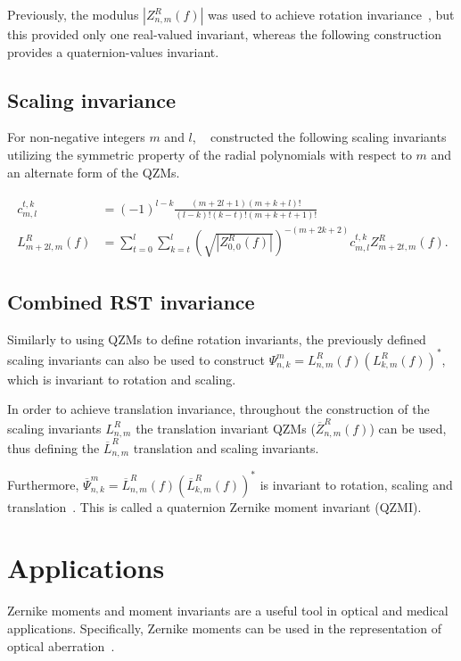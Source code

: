 Previously, the modulus $|Z_{n,m}^R(f)|$ was used to achieve rotation invariance~\cite{qzm}, but this provided only one real-valued invariant, whereas the following construction provides a quaternion-values invariant.

\subsection{Scaling invariance}
For non-negative integers $m$ and $l$, \citeauthor{qzmi}~\cite{qzmi} constructed the following scaling invariants utilizing the symmetric property of the radial polynomials with respect to $m$ and an alternate form of the QZMs.

\begin{gather*}
  \begin{split}
  c_{m,l}^{t,k} &= (-1)^{l-k}\frac{(m + 2l + 1)(m + k + l)!}{(l - k)!(k - t)!(m + k + t + 1)!} \\
  L_{m + 2l,m}^R(f) &= \sum_{t=0}^l\sum_{k=t}^l\left(\sqrt{|Z_{0,0}^R(f)|}\right)^{-(m+2k+2)}c_{m,l}^{t,k}Z_{m+2t,m}^R(f).
  \end{split}
\end{gather*}

\subsection{Combined RST invariance}
Similarly to using QZMs to define rotation invariants, the previously defined scaling invariants can also be used to construct $\Psi_{n,k}^m = L_{n,m}^R(f)(L_{k,m}^R(f))^*$, which is invariant to rotation and scaling.

In order to achieve translation invariance, throughout the construction of the scaling invariants $L_{n,m}^R$ the translation invariant QZMs ($\overline{Z}_{n,m}^R(f)$) can be used, thus defining the $\overline{L}_{n,m}^R$ translation and scaling invariants.

Furthermore, $\overline{\Psi}_{n,k}^m = \overline{L}_{n,m}^R(f)(\overline{L}_{k,m}^R(f))^*$ is invariant to rotation, scaling and translation~\cite{qzmi}. This is called a quaternion Zernike moment invariant (QZMI).

\section{Applications}
Zernike moments and moment invariants are a useful tool in optical and medical applications. Specifically, Zernike moments can be used in the representation of optical aberration~\cite{wavefront,optical_human_eye,opt_surf}.

